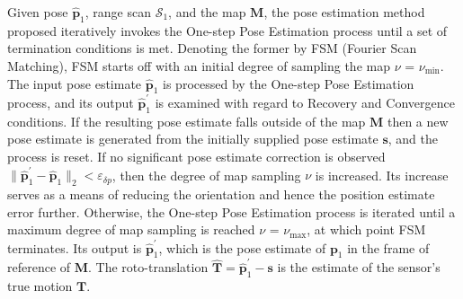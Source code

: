 Given pose $\hat{\bm{p}}_1$, range scan $\mathcal{S}_1$, and the map $\bm{M}$,
the pose estimation method proposed iteratively invokes the One-step Pose
Estimation process until a set of termination conditions is met. Denoting the
former by FSM (Fourier Scan Matching), FSM starts off with an initial degree of
sampling the map $\nu$ = $\nu_{\min}$. The input pose estimate
$\hat{\bm{p}}_1$ is processed by the One-step Pose Estimation process, and its
output $\hat{\bm{p}}_1^\prime$ is examined with regard to Recovery and
Convergence conditions. If the resulting pose estimate falls outside of the map
$\bm{M}$ then a new pose estimate is generated from the initially supplied pose
estimate $\bm{s}$, and the process is reset.  If no significant pose estimate
correction is observed $\|\hat{\bm{p}}_1^\prime-\hat{\bm{p}}_1\|_2 <
\varepsilon_{\delta p}$, then the degree of map sampling $\nu$ is increased.
Its increase serves as a means of reducing the orientation and hence the
position estimate error further.  Otherwise, the One-step Pose Estimation
process is iterated until a maximum degree of map sampling is reached $\nu$ =
$\nu_{\max}$, at which point FSM terminates. Its output is
$\hat{\bm{p}}_1^\prime$, which is the pose estimate of $\bm{p}_1$ in the frame
of reference of $\bm{M}$. The roto-translation $\hat{\bm{T}} =
\hat{\bm{p}}_1^\prime - \bm{s}$ is the estimate of the sensor's true motion
$\bm{T}$.
